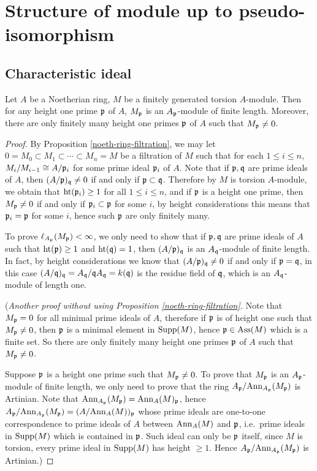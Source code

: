 \section{Structure of module up to pseudo-isomorphism}

\subsection{Characteristic ideal}

\begin{prop}
\label{char-ideal-preliminary}
Let $A$ be a Noetherian ring, $M$ be a
finitely generated torsion $A$-module.
Then for any height one prime ${\mathfrak{p}}$ of $A$,
$M_{\mathfrak{p}}$ is an $A_{\mathfrak{p}}$-module of finite length. Moreover, there are only finitely
many height one primes ${\mathfrak{p}}$ of $A$ such that $M_{\mathfrak{p}}\neq 0$.
\end{prop}

\begin{proof}
By Proposition \ref{noeth-ring-filtration},
we may let $0=M_0\subset M_1\subset\cdots\subset M_n=M$ be a filtration of $M$
such that for each $1\leq i\leq n$,
$M_i/M_{i-1}\cong A/{\mathfrak{p}}_i$ for some prime ideal ${\mathfrak{p}}_i$ of $A$.
Note that if ${\mathfrak{p}},{\mathfrak{q}}$ are prime ideals of $A$,
then $(A/{\mathfrak{p}})_{\mathfrak{q}}\neq 0$ if and only if ${\mathfrak{p}}\subset{\mathfrak{q}}$.
Therefore by $M$ is torsion $A$-module, we obtain that ${\mathrm{ht}}({\mathfrak{p}}_i)\geq 1$
for all $1\leq i\leq n$,
and if ${\mathfrak{p}}$ is a height one prime, then $M_{\mathfrak{p}}\neq 0$
if and only if ${\mathfrak{p}}_i\subset{\mathfrak{p}}$ for some $i$,
by height considerations this means that ${\mathfrak{p}}_i={\mathfrak{p}}$ for some $i$,
hence such ${\mathfrak{p}}$ are only finitely many.

To prove $\ell_{A_{\mathfrak{p}}}(M_{\mathfrak{p}})<\infty$,
we only need to show that if ${\mathfrak{p}},{\mathfrak{q}}$ are prime ideals of $A$
such that ${\mathrm{ht}}({\mathfrak{p}})\geq 1$ and ${\mathrm{ht}}({\mathfrak{q}})=1$,
then $(A/{\mathfrak{p}})_{\mathfrak{q}}$ is an $A_{\mathfrak{q}}$-module of finite length.
In fact, by height considerations we know that $(A/{\mathfrak{p}})_{\mathfrak{q}}\neq 0$
if and only if ${\mathfrak{p}}={\mathfrak{q}}$, in this case $(A/{\mathfrak{q}})_{\mathfrak{q}}=A_{\mathfrak{q}}/{\mathfrak{q}} A_{\mathfrak{q}}
=k({\mathfrak{q}})$ is the residue field of ${\mathfrak{q}}$, which is
an $A_{\mathfrak{q}}$-module of length one.

(\emph{Another proof without using Proposition \ref{noeth-ring-filtration}.}
Note that $M_{\mathfrak{p}}=0$ for all minimal prime ideals of $A$,
therefore if ${\mathfrak{p}}$ is of height one such that $M_{\mathfrak{p}}\neq 0$,
then ${\mathfrak{p}}$ is a minimal element in ${\mathrm{Supp}}(M)$, hence ${\mathfrak{p}}\in\operatorname{Ass}(M)$
which is a finite set.
So there are only finitely
many height one primes ${\mathfrak{p}}$ of $A$ such that $M_{\mathfrak{p}}\neq 0$.

Suppose ${\mathfrak{p}}$ is a height one prime such that $M_{\mathfrak{p}}\neq 0$.
To prove that $M_{\mathfrak{p}}$ is an $A_{\mathfrak{p}}$-module of finite length,
we only need to prove that the ring $A_{\mathfrak{p}}/{\mathrm{Ann}}_{A_{\mathfrak{p}}}(M_{\mathfrak{p}})$
is Artinian. Note that ${\mathrm{Ann}}_{A_{\mathfrak{p}}}(M_{\mathfrak{p}})={\mathrm{Ann}}_A(M)_{\mathfrak{p}}$,
hence $A_{\mathfrak{p}}/{\mathrm{Ann}}_{A_{\mathfrak{p}}}(M_{\mathfrak{p}})=(A/{\mathrm{Ann}}_A(M))_{\mathfrak{p}}$
whose prime ideals are one-to-one correspondence to prime ideals
of $A$ between ${\mathrm{Ann}}_A(M)$ and ${\mathfrak{p}}$,
i.e.~prime ideals in ${\mathrm{Supp}}(M)$ which is contained in ${\mathfrak{p}}$.
Such ideal can only be ${\mathfrak{p}}$ itself,
since $M$ is torsion, every prime ideal in ${\mathrm{Supp}}(M)$ has height $\geq 1$.
Hence $A_{\mathfrak{p}}/{\mathrm{Ann}}_{A_{\mathfrak{p}}}(M_{\mathfrak{p}})$
is Artinian.)
\end{proof}

